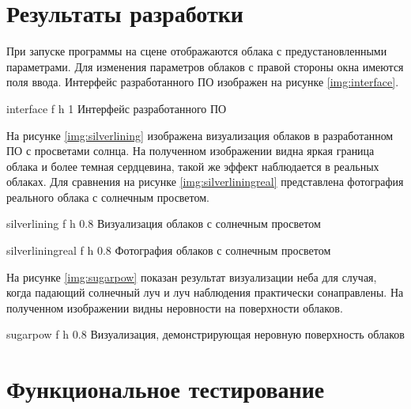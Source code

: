 \section{Результаты разработки}

При запуске программы на сцене отображаются облака с предустановленными параметрами. Для изменения параметров облаков с правой стороны окна имеются поля ввода. Интерфейс разработанного ПО изображен на рисунке \ref{img:interface}.


{interface} %
{f} %
{h} %
{1\textwidth} %
{Интерфейс разработанного ПО} %


На рисунке \ref{img:silverlining} изображена визуализация облаков в разработанном ПО с просветами солнца. На полученном изображении видна яркая граница облака и более темная сердцевина, такой же эффект наблюдается в реальных облаках. Для сравнения на рисунке \ref{img:silverliningreal} представлена фотография реального облака с солнечным просветом.

{silverlining} %
{f} %
{h} %
{0.8\textwidth} %
{Визуализация облаков с солнечным просветом} %


{silverliningreal} %
{f} %
{h} %
{0.8\textwidth} %
{Фотография облаков с солнечным просветом} %

На рисунке \ref{img:sugarpow} показан результат визуализации неба для случая, когда падающий солнечный луч и луч наблюдения практически сонаправлены. На полученном изображении видны неровности на поверхности облаков. 

{sugarpow} %
{f} %
{h} %
{0.8\textwidth} %
{Визуализация, демонстрирующая неровную поверхность облаков} %

\clearpage

\section{Функциональное тестирование}

